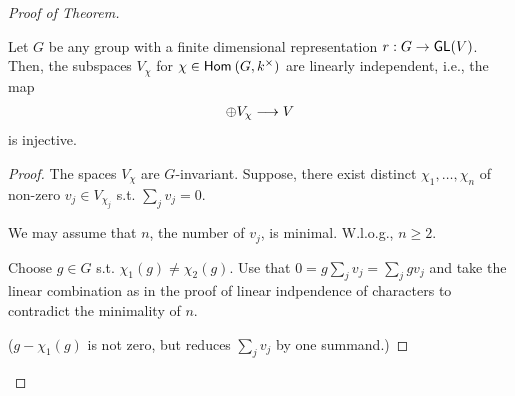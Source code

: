 \begin{proof}[Proof of Theorem]
\begin{lemma}
	Let $G$ be any group with a finite dimensional representation $r : G \overset{}{\rightarrow} \textsf{GL}(V)$. Then, the subspaces $V_\chi$ for $\chi \in \textsf{Hom}_{}\left(G, k^\times\right)$ are linearly independent, i.e., the map
	\begin{align*}
	\oplus V_\chi \overset{}{\longrightarrow} V
	\end{align*}
	is injective.
\end{lemma}
\begin{proof}
	The spaces $V_\chi$ are $G$-invariant. Suppose, there exist distinct $\chi_1, \ldots, \chi_n$ of non-zero $v_j \in V_{\chi_j}$ s.t. $\sum_j v_j = 0$.
	
	We may assume that $n$, the number of $v_j$, is minimal. W.l.o.g., $n \geq 2$.
	
	Choose $g \in G$ s.t. $\chi_1(g) \neq \chi_2(g)$. Use that $0 = g\sum_j v_j = \sum_j gv_j$ and take the linear combination as in the proof of linear indpendence of characters to contradict the minimality of $n$.
	
	($g- \chi_1(g)$ is not zero, but reduces $\sum_j v_j $ by one summand.)
\end{proof}

\end{proof}

